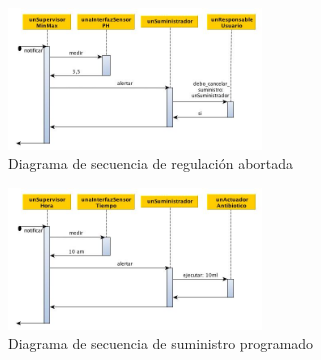 \clearpage

\begin{figure}[h!]
  \centering
  \includegraphics[width=0.6\textwidth]{./imagenes/secuencia_suministro2.jpg}
  \caption{Diagrama de secuencia de regulación abortada}
  \label{fig:sec_sum1}
\end{figure}

\begin{figure}[h!]
  \centering
  \includegraphics[width=0.6\textwidth]{./imagenes/secuencia_suministro3.jpg}
  \caption{Diagrama de secuencia de suministro programado}
  \label{fig:sec_sum1}
\end{figure}
